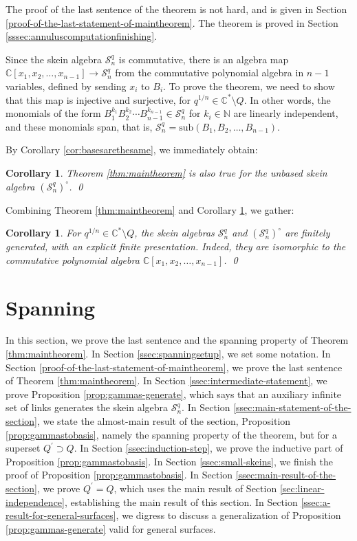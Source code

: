 \documentclass[12pt,
	]{amsart}
\newtheorem{corollary}[theorem]{Corollary}
\theoremstyle{definition}
\newcommand{\mrm}[1]{\mathrm{#1}}
\newcommand{\mbb}[1]{\mathbb{#1}}
\newcommand{\mcal}[1]{\mathcal{#1}}
\newcommand{\lp}{\left(}\newcommand{\rp}{\right)}
\newcommand{\sub}[1]{\mrm{sub}\lp#1\rp}
\newcommand{\unbased}[1]{#1^\circ}
\newcommand{\nnegZ}{\mbb{N}}
\newcommand{\C}{\mbb{C}}
\newcommand{\sC}{\C^\ast}
\newcommand{\sk}{\mcal{S}_n^q}
\newcommand{\usk}{\unbased{\lp\sk\rp}}
\newcommand{\badset}{Q}
\newcommand{\altbadset}{Q^\prime}
\newcommand{\qroot}{q^{1/n}}
\begin{document}
The proof of the last sentence of the theorem is not hard, and is given in Section \ref{proof-of-the-last-statement-of-maintheorem}.  The theorem is proved in Section \ref{sssec:annuluscomputationfinishing}.  

Since the skein algebra $\sk$ is commutative, there is an algebra map $\C[x_1,x_2,\dots,x_{n-1}]\to\sk$ from the commutative polynomial algebra in $n-1$ variables, defined by sending $x_i$ to $B_i$.  To prove the theorem, we need to show that this map is injective and surjective, for $\qroot\in\sC\setminus\badset$.  
In other words, the monomials of the form $B_{1}^{k_1}B_{2}^{k_2}\cdots B_{n-1}^{k_{n-1}}\in\sk$ for $k_i\in\nnegZ$ are linearly independent, and these monomials span, that is, $\sk=\sub{B_1,B_2,\dots,B_{n-1}}$.  

By Corollary \ref{cor:basesarethesame}, we immediately obtain:

\begin{corollary}\label{cor:mainthmforunbased}
 Theorem {\upshape\ref{thm:maintheorem}} is also true for the unbased skein algebra $\usk$.  \qed
 \end{corollary}
 
Combining Theorem \ref{thm:maintheorem} and Corollary \ref{cor:mainthmforunbased}, we gather:
 
\begin{corollary}\label{cor:finitegenerated}
For $\qroot\in\sC\setminus\badset$, the skein algebras $\sk$ and $\usk$ are finitely generated, with an explicit finite presentation.  Indeed, they are isomorphic to the commutative polynomial algebra $\C[x_1,x_2,\dots,x_{n-1}]$. \qed
\end{corollary}

\section{Spanning}\label{sec:spanning}

In this section, we prove the last sentence and the spanning property of Theorem \ref{thm:maintheorem}.  In Section \ref{ssec:spanningsetup}, we set some notation.  In Section \ref{proof-of-the-last-statement-of-maintheorem}, we prove the last sentence of Theorem \ref{thm:maintheorem}.  In Section \ref{ssec:intermediate-statement}, we prove Proposition \ref{prop:gammas-generate}, which says that an auxiliary infinite set of links generates the skein algebra $\sk$.     In Section \ref{ssec:main-statement-of-the-section}, we state the almost-main result of the section, Proposition \ref{prop:gammastobasis}, namely the spanning property of the theorem, but for a superset $\altbadset\supset\badset$.  In Section \ref{ssec:induction-step}, we prove the inductive part of Proposition \ref{prop:gammastobasis}.  In Section \ref{ssec:small-skeins}, we finish the proof of Proposition \ref{prop:gammastobasis}.  In Section \ref{ssec:main-result-of-the-section}, we prove $\altbadset=\badset$, which uses the main result of Section \ref{sec:linear-independence}, establishing the main result of this section.  In Section \ref{ssec:a-result-for-general-surfaces}, we digress to discuss a generalization of Proposition \ref{prop:gammas-generate} valid for general surfaces.  
\end{document}
